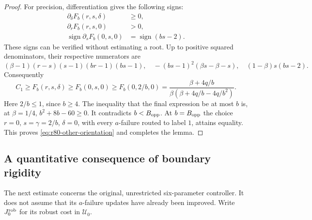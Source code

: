 \begin{proof}
For precision, differentiation gives the following signs:
\begin{align*}
 \partial_\delta F_b(r,s,\delta)&\ge0,\\
 \partial_r F_b(r,s,0)&>0,\\
 \operatorname{sign}\partial_s F_b(0,s,0)
        &=\operatorname{sign}(bs-2).
\end{align*}
These signs can be verified without estimating a root.  Up to
positive squared denominators, their respective numerators are
\[
 (\beta-1)(r-s)(s-1)(br-1)(bs-1),\quad
 -(bs-1)^2(\beta s-\beta-s),\quad
 (1-\beta)s(bs-2).
\]
Consequently
\[
 C_1\ge F_b(r,s,\delta)
       \ge F_b(0,s,0)
       \ge F_b(0,2/b,0)
       =\frac{\beta+4q/b}
          {\beta(\beta+4q/b-4q/b^2)}.
\]
Here $2/b\le1$, since $b\ge4$.  The inequality that the final
expression be at most $b$ is, at $\beta=1/4$,
$b^2+8b-60\ge0$.  It contradicts $b<B_{\rm opp}$.
At $b=B_{\rm opp}$ the choice
$r=0$, $s=\gamma=2/b$, $\delta=0$, with every $a$-failure
routed to label $1$, attains equality.  This proves
\eqref{eq:r80-other-orientation} and completes the lemma.
\end{proof}

\subsection{A quantitative consequence of boundary rigidity}

The next estimate concerns the original, unrestricted six-parameter
controller.  It does not assume that its $a$-failure updates have
already been improved.  Write $J_0^{\rm rob}$ for its robust cost in
$\mathcal U_0$.

